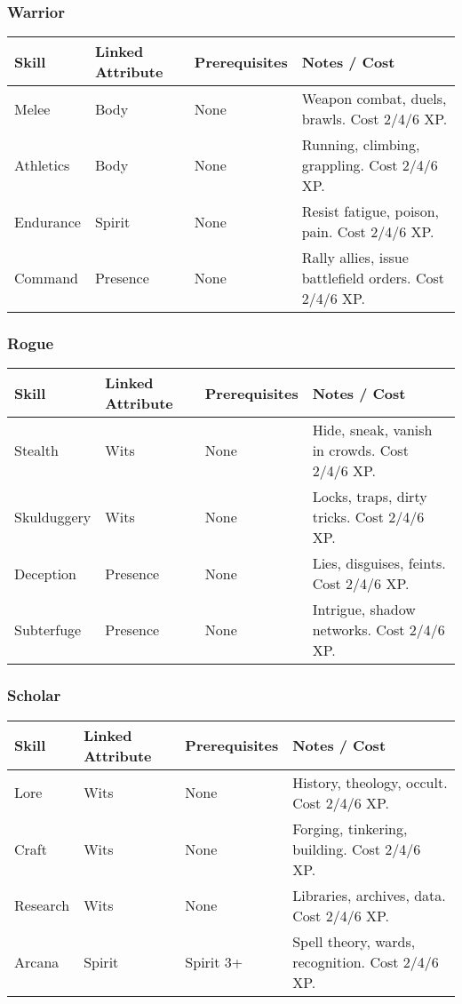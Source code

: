\documentclass[12pt]{book}
\begin{document}
\subsubsection*{Warrior}
\begin{tabular}{@{}llll@{}}
\toprule
\textbf{Skill} & \textbf{Linked Attribute} & \textbf{Prerequisites} & \textbf{Notes / Cost} \\
\midrule
Melee & Body & None & Weapon combat, duels, brawls. Cost 2/4/6 XP. \\
Athletics & Body & None & Running, climbing, grappling. Cost 2/4/6 XP. \\
Endurance & Spirit & None & Resist fatigue, poison, pain. Cost 2/4/6 XP. \\
Command & Presence & None & Rally allies, issue battlefield orders. Cost 2/4/6 XP. \\
\bottomrule
\end{tabular}

\subsubsection*{Rogue}
\begin{tabular}{@{}llll@{}}
\toprule
\textbf{Skill} & \textbf{Linked Attribute} & \textbf{Prerequisites} & \textbf{Notes / Cost} \\
\midrule
Stealth & Wits & None & Hide, sneak, vanish in crowds. Cost 2/4/6 XP. \\
Skulduggery & Wits & None & Locks, traps, dirty tricks. Cost 2/4/6 XP. \\
Deception & Presence & None & Lies, disguises, feints. Cost 2/4/6 XP. \\
Subterfuge & Presence & None & Intrigue, shadow networks. Cost 2/4/6 XP. \\
\bottomrule
\end{tabular}

\subsubsection*{Scholar}
\begin{tabular}{@{}llll@{}}
\toprule
\textbf{Skill} & \textbf{Linked Attribute} & \textbf{Prerequisites} & \textbf{Notes / Cost} \\
\midrule
Lore & Wits & None & History, theology, occult. Cost 2/4/6 XP. \\
Craft & Wits & None & Forging, tinkering, building. Cost 2/4/6 XP. \\
Research & Wits & None & Libraries, archives, data. Cost 2/4/6 XP. \\
Arcana & Spirit & Spirit 3+ & Spell theory, wards, recognition. Cost 2/4/6 XP. \\
\bottomrule
\end{tabular}
\end{document}
